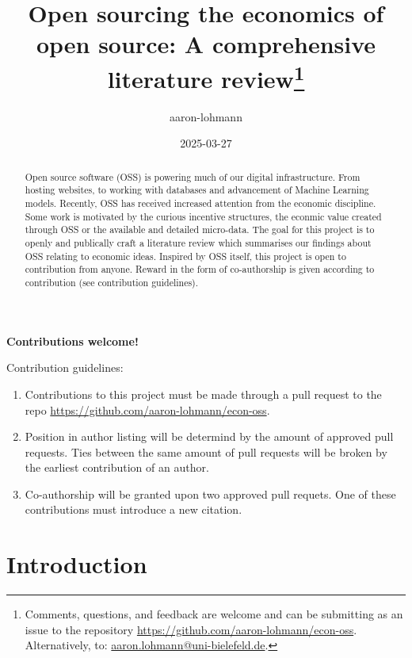 \documentclass[
  12pt,
]{article}
\title{Open sourcing the economics of open source: A comprehensive
literature review\thanks{Comments, questions, and feedback are welcome
and can be submitting as an issue to the repository
\href{https://github.com/aaron-lohmann/econ-oss/issues}{https://github.com/aaron-lohmann/econ-oss}.
Alternatively, to:
\href{aaron.lohmann@uni-bielefeld.de}{aaron.lohmann@uni-bielefeld.de}.}}
\author{aaron-lohmann}
\date{2025-03-27}
\providecommand{\tightlist}{%
  \setlength{\itemsep}{0pt}\setlength{\parskip}{0pt}}\usepackage{longtable,booktabs,array}
\begin{document}
\maketitle
\begin{abstract}
Open source software (OSS) is powering much of our digital
infrastructure. From hosting websites, to working with databases and
advancement of Machine Learning models. Recently, OSS has received
increased attention from the economic discipline. Some work is motivated
by the curious incentive structures, the econmic value created through
OSS or the available and detailed micro-data. The goal for this project
is to openly and publically craft a literature review which summarises
our findings about OSS relating to economic ideas. Inspired by OSS
itself, this project is open to contribution from anyone. Reward in the
form of co-authorship is given according to contribution (see
contribution guidelines).
\end{abstract}

\begin{center}
\bf{Contributions welcome!}
\end{center}

Contribution guidelines:

\begin{enumerate}
\def\labelenumi{\arabic{enumi}.}
\tightlist
\item
  Contributions to this project must be made through a pull request to
  the repo \url{https://github.com/aaron-lohmann/econ-oss}.
\item
  Position in author listing will be determind by the amount of approved
  pull requests. Ties between the same amount of pull requests will be
  broken by the earliest contribution of an author.
\item
  Co-authorship will be granted upon two approved pull requets. One of
  these contributions must introduce a new citation.
\end{enumerate}

\newpage

\section{Introduction}\label{sec-introduction}
\end{document}
